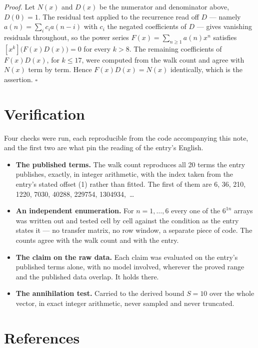 \documentclass[11pt]{article}
\theoremstyle{definition}
\begin{document}
{\itshape Proof.} Let $N(x)$ and $D(x)$ be the numerator and denominator above, $D(0)=1$. The residual test applied to the recurrence read off $D$ --- namely $a(n) = \sum_i c_i a(n-i)$ with $c_i$ the negated coefficients of $D$ --- gives vanishing residuals throughout, so the power series $F(x)=\sum_{n\ge 1}a(n)x^n$ satisfies $[x^k]\bigl(F(x)D(x)\bigr) = 0$ for every $k > 8$. The remaining coefficients of $F(x)D(x)$, for $k \le 17$, were computed from the walk count and agree with $N(x)$ term by term. Hence $F(x)D(x) = N(x)$ identically, which is the assertion. $\square$

\section{Verification}

Four checks were run, each reproducible from the code accompanying this note, and the first two are what pin the reading of the entry's English.

\begin{itemize}

\item {\bfseries The published terms.} The walk count reproduces all 20 terms the entry publishes, exactly, in integer arithmetic, with the index taken from the entry's stated offset (1) rather than fitted. The first of them are 6, 36, 210, 1220, 7030, 40288, 229754, 1304934,~\dots

\item {\bfseries An independent enumeration.} For $n = 1,\dots,6$ every one of the $6^{1n}$ arrays was written out and tested cell by cell against the condition as the entry states it --- no transfer matrix, no row window, a separate piece of code. The counts agree with the walk count and with the entry.

\item {\bfseries The claim on the raw data.} Each claim was evaluated on the entry's published terms alone, with no model involved, wherever the proved range and the published data overlap. It holds there.

\item {\bfseries The annihilation test.} Carried to the derived bound $S = 10$ over the whole vector, in exact integer arithmetic, never sampled and never truncated.

\end{itemize}

\section{References}
\end{document}
